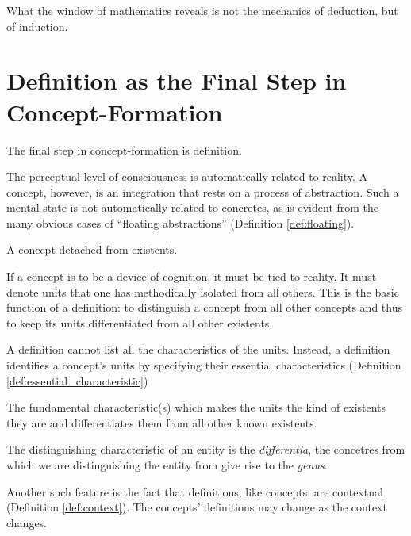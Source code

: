         What the window of mathematics reveals is not the mechanics of deduction, but of induction. 

    \section{Definition as the Final Step in Concept-Formation}

        The final step in concept-formation is definition.

        The perceptual level of consciousness is automatically related to reality. A concept, however, is an integration that rests on a process of abstraction. Such a mental state is not automatically related to concretes, as is evident from the many obvious cases of ``floating abstractions'' (Definition \ref{def:floating}).

            \begin{definition}
            \label{def:floating}
                A concept detached from existents.
            \end{definition}

        If a concept is to be a device of cognition, it must be tied to reality. It must denote units that one has methodically isolated from all others. This is the basic function of a definition: to distinguish a concept from all other concepts and thus to keep its units differentiated from all other existents.

        A definition cannot list all the characteristics of the units. Instead, a definition identifies a concept's units by specifying their essential characteristics (Definition \ref{def:essential_characteristic}) 

            \begin{definition}
            \label{def:essential_characteristic}
                The fundamental characteristic(s) which makes the units the kind of existents they are and differentiates them from all other known existents.
            \end{definition}

        The distinguishing characteristic of an entity is the \textit{differentia}, the concetres from which we are distinguishing the entity from give rise to the \textit{genus}.

        Another such feature is the fact that definitions, like concepts, are contextual (Definition \ref{def:context}). The concepts' definitions may change as the context changes.


